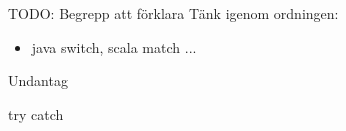


\begin{Slide}{TODO: Begrepp att förklara}
  Tänk igenom ordningen:
  \begin{itemize}
    \item java switch, scala match ... 
  \end{itemize}
\end{Slide}


\begin{Slide}{Undantag}

\begin{Code}
try
catch
\end{Code}
\end{Slide}












